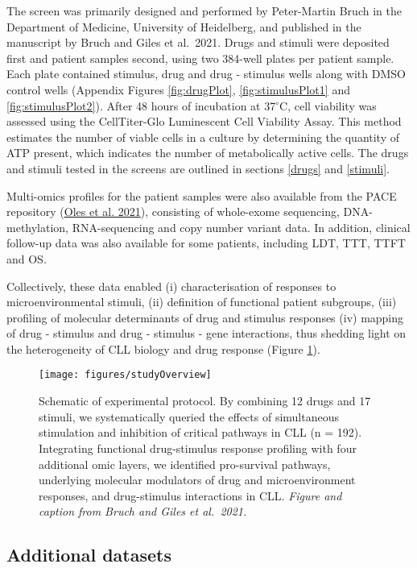 \documentclass[11pt, a4paper, twosided]{book}
\begin{document}
The screen was primarily designed and performed by Peter-Martin Bruch in the Department of Medicine, University of Heidelberg, and published in the manuscript by Bruch and Giles et al.~2021. Drugs and stimuli were deposited first and patient samples second, using two 384-well plates per patient sample. Each plate contained stimulus, drug and drug - stimulus wells along with DMSO control wells (Appendix Figures \ref{fig:drugPlot}, \ref{fig:stimulusPlot1} and \ref{fig:stimulusPlot2}). After 48 hours of incubation at 37\(^\circ\)C, cell viability was assessed using the CellTiter-Glo Luminescent Cell Viability Assay. This method estimates the number of viable cells in a culture by determining the quantity of ATP present, which indicates the number of metabolically active cells. The drugs and stimuli tested in the screens are outlined in sections \ref{drugs} and \ref{stimuli}.

Multi-omics profiles for the patient samples were also available from the PACE repository (\protect\hyperlink{ref-R-BloodCancerMultiOmics2017}{Oles et al. 2021}), consisting of whole-exome sequencing, DNA-methylation, RNA-sequencing and copy number variant data. In addition, clinical follow-up data was also available for some patients, including LDT, TTT, TTFT and OS.

Collectively, these data enabled (i) characterisation of responses to microenvironmental stimuli, (ii) definition of functional patient subgroups, (iii) profiling of molecular determinants of drug and stimulus responses (iv) mapping of drug - stimulus and drug - stimulus - gene interactions, thus shedding light on the heterogeneity of CLL biology and drug response (Figure \ref{fig:studyOverview}).


\begin{figure}

{\centering \texttt{[image: figures/studyOverview]} 

}

\caption{Schematic of experimental protocol. By combining 12 drugs and 17 stimuli, we systematically queried the effects of simultaneous stimulation and inhibition of critical pathways in CLL (n = 192). Integrating functional drug-stimulus response profiling with four additional omic layers, we identified pro-survival pathways, underlying molecular modulators of drug and microenvironment responses, and drug-stimulus interactions in CLL. \emph{Figure and caption from Bruch and Giles et al.~2021.}}\label{fig:studyOverview}
\end{figure}
\hypertarget{additional-datasets}{%
\subsection{Additional datasets}\label{additional-datasets}}
\end{document}
